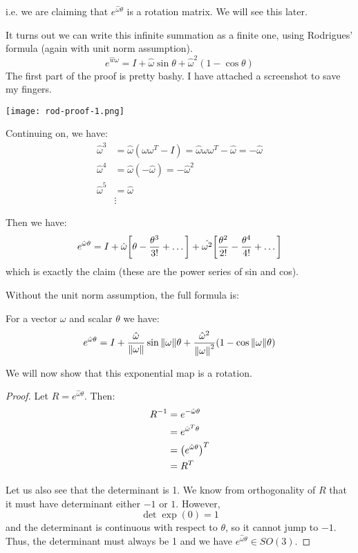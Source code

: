 i.e. we are claiming that $e^{\hat{\omega} \theta}$ is a rotation matrix. We will see this later.

It turns out we can write this infinite summation as a finite one, using Rodrigues' formula (again with unit norm assumption).
\[ e^{\hat{w} \omega} = I + \hat{\omega} \sin \theta + \hat{\omega}^2 (1 - \cos \theta) \]
The first part of the proof is pretty bashy. I have attached a screenshot to save my fingers.

\texttt{[image: rod-proof-1.png]}

Continuing on, we have:
\begin{align*}
    \hat{\omega}^3 &= \hat{\omega}(\omega \omega^T - I) = \hat{\omega} \omega \omega^T - \hat{\omega} = - \hat{\omega} \\
    \hat{\omega}^4 &= \hat{\omega} (-\hat{\omega}) = - \hat{\omega}^2 \\
    \hat{\omega}^5 &= \hat{\omega} \\
    &\vdots 
\end{align*}

Then we have:
\[ e^{\hat{\omega} \theta} = I + \hat{\omega} \qty[\theta - \frac{\theta^3}{3!} + \dots] + \hat{\omega^2} \qty[\frac{\theta^2}{2!} - \frac{\theta^4}{4!} + \dots ] \]
which is exactly the claim (these are the power series of sin and cos).

Without the unit norm assumption, the full formula is:
\begin{theorem}
    For a vector $\omega$ and scalar $\theta$ we have:
    \[ e^{\hat{\omega} \theta} = I + \frac{\hat{\omega}}{\norm{\omega}} \sin \norm{\omega} \theta + \frac{\hat{\omega}^2}{\norm{\omega}^2}(1 - \cos \norm{\omega} \theta) \]
\end{theorem}

We will now show that this exponential map is a rotation.
\begin{proof}
    Let $R = e^{\hat{\omega} \theta}$. Then:
    \begin{align*}
        R^{-1} &= e^{-\hat{\omega} \theta} \\
        &= e^{\hat{\omega}^T \theta} \\
        &= \qty(e^{\hat{\omega} \theta})^T \\
        &= R^T
    \end{align*}

    Let us also see that the determinant is 1. We know from orthogonality of $R$ that it
    must have determinant either $-1$ or $1$. However,
    \[ \det \exp(0) = 1 \]
    and the determinant is continuous with respect to $\theta$, so it cannot jump to $-1$. Thus,
    the determinant must always be 1 and we have $e^{\hat{\omega} \theta} \in SO(3)$.
\end{proof}


